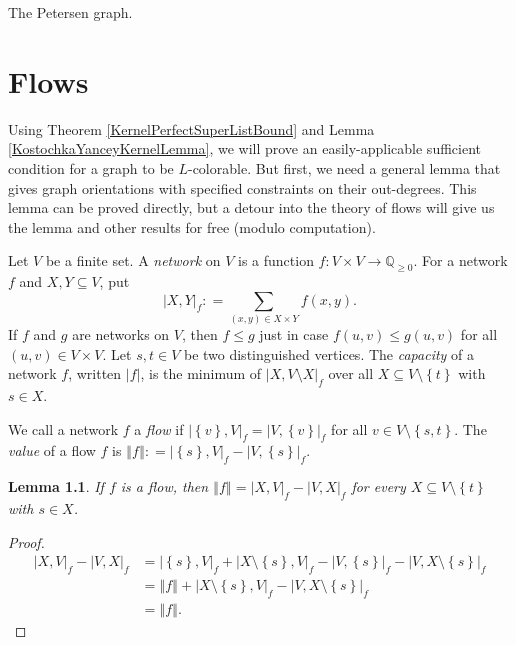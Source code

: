 \documentclass[openany]{tufte-book} %
\theoremstyle{plain}
\newtheorem{lemma}{Lemma}
\newcommand{\set}[1]{\left\{ #1 \right\}}
\newcommand{\card}[1]{\left|#1\right|}
\newcommand{\size}[1]{\left\Vert#1\right\Vert}
\newcommand{\func}[3]{#1\colon #2 \rightarrow #3}
\newcommand{\DefinedAs}{\mathrel{\mathop:}=}
\newcommand{\Q}{\mathbb{Q}}
\begin{document}
\begin{marginfigure}
\caption{The Petersen graph.}
\end{marginfigure}
\chapter{Flows}
Using Theorem \ref{KernelPerfectSuperListBound} and Lemma \ref{KostochkaYanceyKernelLemma}, we will prove an easily-applicable sufficient condition for a graph to be $L$-colorable.  
But first, we need a general lemma that gives graph orientations with specified constraints on their out-degrees.  This lemma can be proved directly, 
but a detour into the theory of flows will give us the lemma and other results for free (modulo computation).

Let $V$ be a finite set.  A \emph{network} on $V$ is a function $\func{f}{V\times V}{\Q_{\ge 0}}$.  For a network $f$ and $X,Y \subseteq V$, put
\[\card{X,Y}_f \DefinedAs \sum_{(x,y) \in X\times Y} f(x,y).\]
If $f$ and $g$ are networks on $V$, then $f \le g$ just in case $f(u,v) \le g(u,v)$ for all $(u,v)\in V\times V$.
Let $s,t \in V$ be two distinguished vertices.  The \emph{capacity} of a network $f$, written $\card{f}$, is the minimum of $\card{X, V\setminus X}_f$ over all $X \subseteq V\setminus\set{t}$ with $s \in X$.

We call a network $f$ a \emph{flow} if $\card{\set{v},V}_f = \card{V,\set{v}}_f$ for all $v \in V \setminus \set{s,t}$.
The \emph{value} of a flow $f$ is $\size{f} \DefinedAs \card{\set{s},V}_f - \card{V,\set{s}}_f$.

\begin{lemma}\label{FlowValues}
If $f$ is a flow, then $\size{f} = \card{X, V}_f - \card{V, X}_f$ for every $X \subseteq V\setminus\set{t}$ with $s \in X$.
\end{lemma}
\begin{proof}
\begin{align*}
\card{X, V}_f - \card{V, X}_f &= \card{\set{s}, V}_f + \card{X\setminus\set{s}, V}_f - \card{V, \set{s}}_f - \card{V, X\setminus\set{s}}_f\\
&= \size{f} + \card{X\setminus\set{s}, V}_f - \card{V, X\setminus\set{s}}_f\\
&= \size{f}.
\end{align*}
\end{proof}
\end{document}
